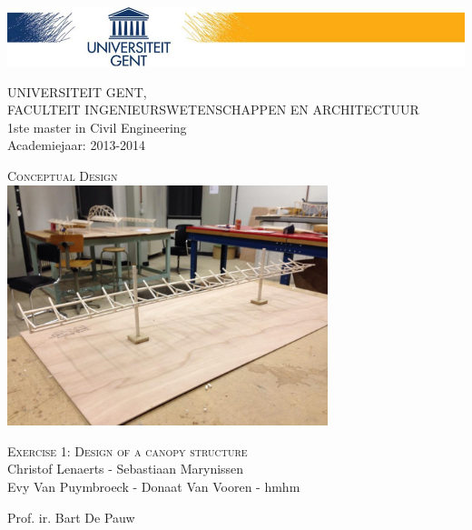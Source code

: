 \documentclass[a4paper]{article}
\begin{document}
\begin{titlepage}
\includegraphics[width=\textwidth]{Hoofding.png}
\begin{flushleft}
UNIVERSITEIT GENT,\\
FACULTEIT INGENIEURSWETENSCHAPPEN EN ARCHITECTUUR\\
1ste master in Civil Engineering\\
Academiejaar: 2013-2014
\end{flushleft}

\begin{center}

\vspace*{\fill}

\textsc{\huge Conceptual Design}\\
[1.5cm]
\includegraphics[width=0.7\textwidth]{ons.jpg}

\vspace{1.5cm}

\textsc{\LARGE Exercise 1: Design of a canopy structure}\\
[1cm]
Christof Lenaerts - Sebastiaan Marynissen \\
Evy Van Puymbroeck - Donaat Van Vooren - hmhm
\vspace*{\fill}

\end{center}

\begin{flushbottom}
\begin{flushleft}
Prof. ir. Bart De Pauw \\
\end{flushleft}
\end{flushbottom}

\end{titlepage}
\end{document}
